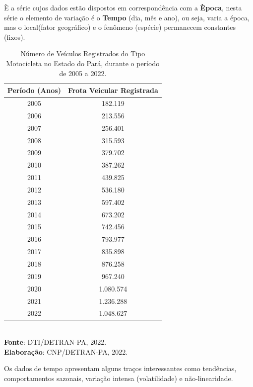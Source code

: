 \inic È a série cujos dados estão dispostos em correspondência
com a \textbf{Època}, nesta série o elemento de variação é o \textbf{Tempo} (dia,
mês e ano), ou seja, varia a época, mas o local(fator geográfico) e o fenômeno (espécie)
permanecem constantes (fixos).


\begin{table}[!htb]
    \centering
    {
    \caption{Número de Veículos Registrados do Tipo Motocicleta no Estado do Pará, durante o período de 2005 a 2022.}
    \label{obitos}
    \vspace{0.1cm}
\begin{tabular}{c|c}
  \hline\hline
  Período (Anos)   & Frota Veicular Registrada \\
  \hline\hline
  2005   & 182.119   \\
  2006   & 213.556   \\
  2007   &  256.401  \\
  2008   &  315.593  \\
  2009   &  379.702 \\
  2010   & 387.262  \\
  2011   & 439.825 \\
  2012   & 536.180  \\
  2013   & 597.402  \\
  2014   & 673.202 \\
  2015   & 742.456 \\
  2016   & 793.977 \\
  2017   & 835.898 \\
  2018   & 876.258 \\
  2019   & 967.240 \\
  2020   & 1.080.574 \\
  2021   & 1.236.288 \\
  2022   & 1.048.627   \\
  \hline\hline
\end{tabular}}
\\
\hspace{-2.5cm}
\textbf{Fonte}: DTI/DETRAN-PA, 2022. \\
\hspace{-1.6cm}
\textbf{Elaboração}: CNP/DETRAN-PA, 2022.
\end{table}


Os dados de tempo apresentam alguns traços interessantes como tendências, comportamentos sazonais, variação intensa (volatilidade) e não-linearidade.\vskip0.3cm






